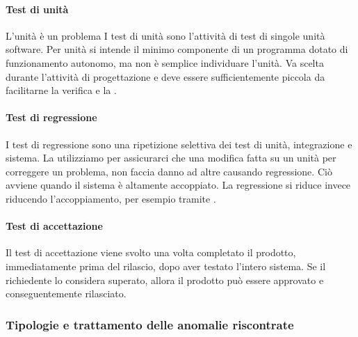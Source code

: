 			
			\paragraph{Test di unità} \label{testunita} 
			L'unità è un problema 
			I test di unità sono l'attività di test di singole unità software.
			Per unità si intende il minimo componente di un programma dotato di funzionamento autonomo, ma non è semplice individuare l'unità.
			Va scelta durante l'attività di progettazione e deve essere sufficientemente piccola da facilitarne la verifica e la . 
			
			
			\paragraph{Test di regressione} \label{testregressione}
			I test di regressione sono una ripetizione selettiva dei test di unità, integrazione e sistema.
			La utilizziamo per assicurarci che una modifica fatta su un unità per correggere un problema, non faccia danno ad altre causando regressione.
			Ciò avviene quando il sistema è altamente accoppiato. 
			La regressione si riduce invece riducendo l'accoppiamento, per esempio tramite .
			
			\paragraph{Test di accettazione} \label{testaccettazione}
			Il test di accettazione viene svolto una volta completato il prodotto, immediatamente prima del rilascio, dopo aver testato l'intero sistema.
			Se il richiedente lo considera superato, allora il prodotto può essere approvato e conseguentemente rilasciato.
		
		
		\subsubsection{Tipologie e trattamento delle anomalie riscontrate}\label{TrattamentoAnomalie} %
		